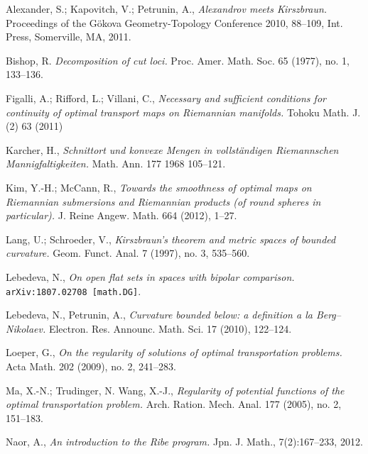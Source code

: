 \documentclass{article}
\begin{document}
\begin{thebibliography}{52}
 Alexander, S.; Kapovitch, V.; Petrunin,  A.,
\emph{Alexandrov meets Kirszbraun.} 
Proceedings of the Gökova Geometry-Topology Conference 2010, 88--109, Int. Press, Somerville, MA, 2011.

 Bishop, R.
\emph{Decomposition of cut loci.}
Proc. Amer. Math. Soc. 65 (1977), no. 1, 133--136.




 Figalli, A.; Rifford, L.; Villani, C.,
\emph{Necessary and sufficient conditions for continuity of optimal transport maps on Riemannian manifolds.} Tohoku Math. J. (2) 63 (2011)

Karcher, H.,
\emph{Schnittort und konvexe Mengen in vollständigen Riemannschen Mannigfaltigkeiten.}
Math. Ann. 177 1968 105--121.

 Kim, Y.-H.; McCann, R.,
\emph{Towards the smoothness of optimal maps on Riemannian submersions and Riemannian products (of round spheres in particular).}
J. Reine Angew. Math. 664 (2012), 1--27. 

  Lang, U.; Schroeder, V.,
\emph{Kirszbraun's theorem and metric spaces of bounded curvature.}
Geom. Funct. Anal. 7 (1997), no. 3, 535–560. 

 Lebedeva, N.,  \emph{On open flat sets in spaces with bipolar comparison.} \texttt{arXiv:1807.02708 [math.DG]}.

 Lebedeva, N., Petrunin, A., \emph{Curvature bounded below: a definition a la Berg--Nikolaev.} Electron. Res. Announc. Math. Sci. 17 (2010), 122--124.

Loeper, G.,
\emph{On the regularity of solutions of optimal transportation problems.}
Acta Math. 202 (2009), no. 2, 241–283. 

  Ma, X.-N.; Trudinger, N.  Wang, X.-J.,
\emph{Regularity of potential functions of the optimal transportation problem.}
Arch. Ration. Mech. Anal. 177 (2005), no. 2, 151--183. 

  Naor, A., \emph{An introduction to the Ribe program.} Jpn. J. Math., 7(2):167--233, 2012.


\end{thebibliography}
\end{document}

